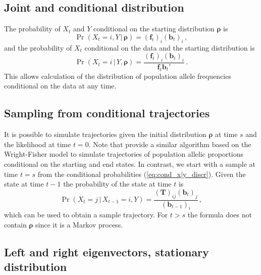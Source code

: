 \documentclass[preprint]{elsarticle}
\newcommand{\bs}[1]{\ensuremath{\boldsymbol{#1}}}
\newcommand\given{{\,|\,}}
\newcommand\x[1]{\ensuremath{X_{#1}}}
\newcommand\y{\ensuremath{Y}}
\newcommand\s{\ensuremath{s}}
\newcommand\fv[1]{\ensuremath{\mathbf{f}_{#1}}}
\newcommand\bv[1]{\ensuremath{\mathbf{b}_{#1}}}
\begin{document}
\subsection{Joint and conditional distribution}

The probability of $\x{t}$ and $\y$ conditional on the starting distribution $\bs{\rho}$ is
\begin{equation}\label{eq:joint_xy_discr}
\Pr(\x{t}=i,\y \given \bs{\rho}) = (\fv{t})_i (\bv{t})_i\,,
\end{equation}
and the probability of $\x{t}$ conditional on the data and the starting distribution is
\begin{equation}\label{eq:cond_x|y_discr}
\Pr(\x{t}=i \given \y,\bs{\rho}) = \frac{(\fv{t})_i (\bv{t})_i}{\fv{t}\bv{t}'}\,.
\end{equation}
This allows calculation of the distribution of population allele frequencies conditional on the data at any time. 

\subsection{Sampling from conditional trajectories}

It is possible to simulate trajectories given the initial distribution $\bs{\rho}$ at time $\s$ and the likelihood at time $t=0$. Note that \citet{Zhao14} provide a similar algorithm based on the Wright-Fisher model to simulate trajectories of population allelic proportions conditional on the starting and end states. In contrast, we start with a sample at time $t=\s$ from the conditional probabilities (\ref{eq:cond_x|y_discr}). Given the state at time $t-1$ the probability of the state at time $t$ is
\begin{equation}
    \Pr(\x{t}=j\given \x{t-1}=i,\y)=\frac{(\mathbf{T})_{ij}(\mathbf{b}_{t})_j}{(\mathbf{b}_{t-1})_i}\,,
\end{equation}
which can be used to obtain a sample trajectory. For $t>s$ the formula does not contain $\bs{\rho}$ since it is a Markov process.

\subsection{Left and right eigenvectors, stationary distribution}
\end{document}
